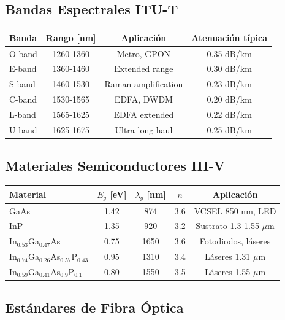 \documentclass[11pt,a4paper]{article}
\begin{document}
\subsection{Bandas Espectrales ITU-T}

\begin{table}[h]
\centering
\begin{tabular}{lccc}
\hline
\textbf{Banda} & \textbf{Rango [nm]} & \textbf{Aplicación} & \textbf{Atenuación típica} \\
\hline
O-band & 1260-1360 & Metro, GPON & 0.35 dB/km \\
E-band & 1360-1460 & Extended range & 0.30 dB/km \\
S-band & 1460-1530 & Raman amplification & 0.23 dB/km \\
C-band & 1530-1565 & EDFA, DWDM & 0.20 dB/km \\
L-band & 1565-1625 & EDFA extended & 0.22 dB/km \\
U-band & 1625-1675 & Ultra-long haul & 0.25 dB/km \\
\hline
\end{tabular}
\end{table}

\subsection{Materiales Semiconductores III-V}

\begin{table}[h]
\centering
\begin{tabular}{lcccc}
\hline
\textbf{Material} & \textbf{$E_g$ [eV]} & \textbf{$\lambda_g$ [nm]} & \textbf{$n$} & \textbf{Aplicación} \\
\hline
GaAs & 1.42 & 874 & 3.6 & VCSEL 850 nm, LED \\
InP & 1.35 & 920 & 3.2 & Sustrato 1.3-1.55 $\mu$m \\
In$_{0.53}$Ga$_{0.47}$As & 0.75 & 1650 & 3.6 & Fotodiodos, láseres \\
In$_{0.74}$Ga$_{0.26}$As$_{0.57}$P$_{0.43}$ & 0.95 & 1310 & 3.4 & Láseres 1.31 $\mu$m \\
In$_{0.59}$Ga$_{0.41}$As$_{0.9}$P$_{0.1}$ & 0.80 & 1550 & 3.5 & Láseres 1.55 $\mu$m \\
\hline
\end{tabular}
\end{table}

\subsection{Estándares de Fibra Óptica}
\end{document}
